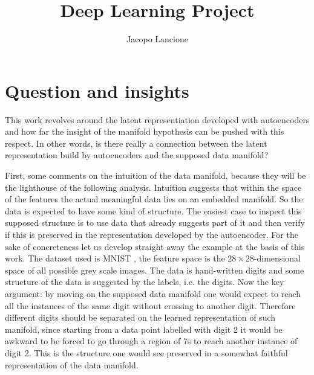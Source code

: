 \documentclass[twocolumn,gsifonts,twoside]{gsipaper}
\begin{document}
\title{\textbf{Deep Learning Project}} %



\author{Jacopo Lancione}            %
\address{Università di Torino, jacopo.lancione@edu.unito.it}

\maketitle




\section{Question and insights}
This work revolves around the latent representiation developed with autoencoders and how far the insight of the manifold hypothesis can be pushed with this respect. In other words, is there really a connection between the latent representation build by autoencoders and the supposed data manifold?

First, some comments on the intuition of the data manifold, because they will be the lighthouse of the following analysis. Intuition suggests that within the space of the features the actual meaningful data lies on an embedded manifold. So the data is expected to have some kind of structure. The easiest case to inspect this supposed structure is to use data that already suggests part of it and then verify if this is preserved in the representation developed by the autoencoder. For the sake of concreteness let us develop straight away the example at the basis of this work. The dataset used is MNIST  %
, the feature space is the $28\times28$-dimensional space of all possible grey scale images. The data is hand-written digits and some structure of the data is suggested by the labels, i.e. the digits. Now the key argument: by moving on the supposed data manifold one would expect to reach all the instances of the same digit without crossing to another digit. Therefore different digits should be separated on the learned representation of such manifold, since starting from a data point labelled with digit 2 it would be awkward to be forced to go through a region of 7s to reach another instance of digit 2. This is the structure one would see preserved in a somewhat faithful representation of the data manifold.
\end{document}
